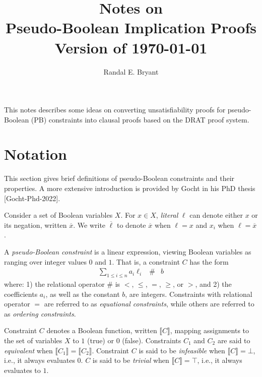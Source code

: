 \documentclass{easychair}
\title{Notes on \\ Pseudo-Boolean Implication Proofs \\ Version of \today}
\author{Randal E. Bryant}
\institute{
Computer Science Department \\
Carnegie Mellon University, Pittsburgh, PA, United States\\
\email{Randy.Bryant@cs.cmu.edu}
}
\renewcommand{\obar}[1]{\overline{#1}}
\newcommand{\lit}{\ell}
\newcommand{\func}[1]{\llbracket#1\rrbracket}
\begin{document}
\maketitle

This notes describes some ideas on converting unsatisfiability proofs
for pseudo-Boolean (PB) constraints into clausal proofs based on the
DRAT proof system.

\section{Notation}

This section gives brief definitions of pseudo-Boolean constraints and their properties.
A more extensive introduction is provided by Gocht in his PhD thesis [Gocht-Phd-2022].

Consider a set of Boolean variables $X$.  For $x \in X$, {\em literal}
$\lit$ can denote either $x$ or its negation, written $\obar{x}$.  We
write $\obar{\lit}$ to denote $\obar{x}$ when $\lit = x$ and $x_i$ when
$\lit = \obar{x}$.

A {\em pseudo-Boolean constraint} is a linear expression, viewing
Boolean variables as ranging over integer values $0$ and $1$.  That
is, 
a constraint $C$ has the form
\begin{eqnarray}
\sum_{1 \leq i \leq n} a_i \lit_i & \# & b \label{eqn:pbconstraint}
\end{eqnarray}
where: 1) the relational operator $\#$ is $<$, $\leq$, $=$, $\geq$, or
$>$, and 2) the coefficients $a_i$, as well as the constant $b$, are
integers.
Constraints with relational operator $=$ are referred to as {\em equational constraints},
while others are referred to as {\em ordering constraints}.

Constraint $C$ denotes a Boolean function, written
$\func{C}$, mapping assignments to the set of variables $X$ to $1$
(true) or $0$ (false).  Constraints $C_1$ and $C_2$ are said to {\em
  equivalent} when $\func{C_1} = \func{C_2}$.
Constraint $C$ is said to be {\em infeasible} when $\func{C} = \bot$, i.e., it always evaluates $0$.
$C$ is said to be {\em trivial} when $\func{C} = \top$, i.e., it always evaluates to $1$.
\end{document}
